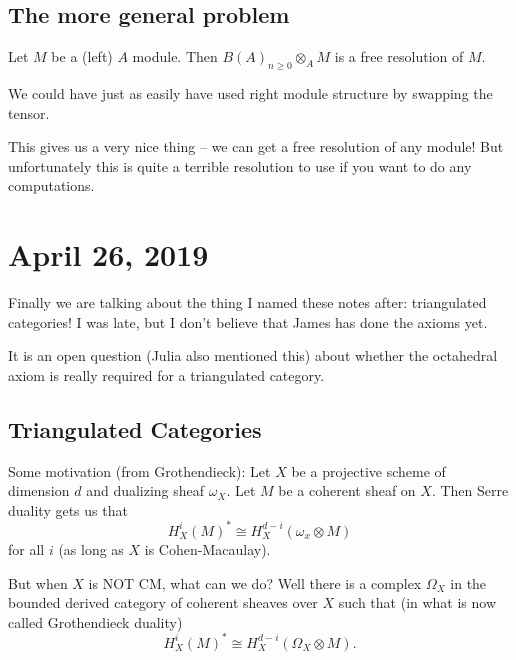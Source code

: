 \documentclass[12pt]{article}
\begin{document}
\subsection{The more general problem}
\begin{lem}
	Let $M$ be a (left) $A$ module. Then $B(A)_{n\ge 0}\otimes_A M$ is a free resolution of $M$.
\end{lem}
\begin{rmk}
	We could have just as easily have used right module structure by swapping the tensor.
\end{rmk}
\begin{rmk}
	This gives us a very nice thing -- we can get a free resolution of any module! But unfortunately this 
	is quite a terrible resolution to use if you want to do any computations.
\end{rmk}

\section{April 26, 2019}
Finally we are talking about the thing I named these notes after: triangulated categories!
I was late, but I don't believe that James has done the axioms yet.
\begin{rmk}
	It is an open question (Julia also mentioned this) about whether the octahedral axiom is really required for a triangulated category.
\end{rmk}
\subsection{Triangulated Categories}
Some motivation (from Grothendieck): Let $X$ be a projective scheme of dimension $d$ and dualizing 
sheaf $\omega_X$. Let $M$ be a coherent sheaf on $X$. Then Serre duality gets us that
\[H_X^i(M)^*\cong H^{d-i}_X(\omega_x\otimes M)\]
for all $i$ (as long as $X$ is Cohen-Macaulay).

But when $X$ is NOT CM, what can we do? Well there is a complex $\Omega_X$ in the bounded derived category of coherent sheaves over $X$
such that (in what is now called Grothendieck duality)
\[H_X^i(M)^*\cong H^{d-i}_X(\Omega_X\otimes M).\]
\end{document}
